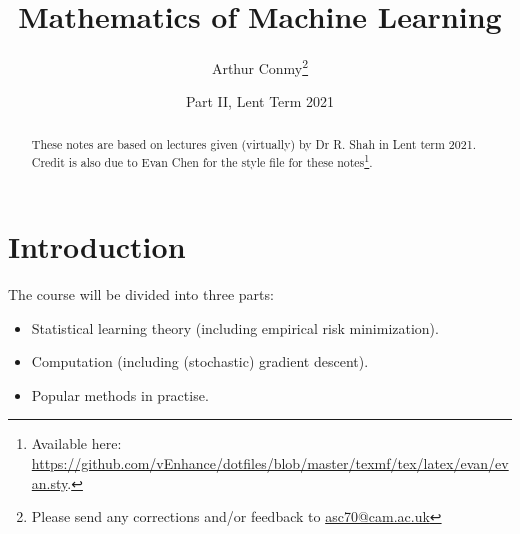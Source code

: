 \documentclass[11pt]{scrartcl}
\begin{document}
\title{Mathematics of Machine Learning}
\author{Arthur Conmy\footnote{Please send any corrections and/or feedback to \url{asc70@cam.ac.uk}}}
\date{Part II, Lent Term 2021}

\maketitle
\begin{abstract}
These notes are based on lectures given (virtually) by Dr R. Shah in Lent term 2021. 
Credit is also due to Evan Chen for the style file for these notes\footnote{Available here: \url{https://github.com/vEnhance/dotfiles/blob/master/texmf/tex/latex/evan/evan.sty}.}.
\end{abstract}

\tableofcontents




% 
\section{Introduction}

The course will be divided into three parts:

\begin{itemize}
    \item Statistical learning theory (including empirical risk minimization).
    \item Computation (including (stochastic) gradient descent).
    \item Popular methods in practise.
\end{itemize}
\end{document}
